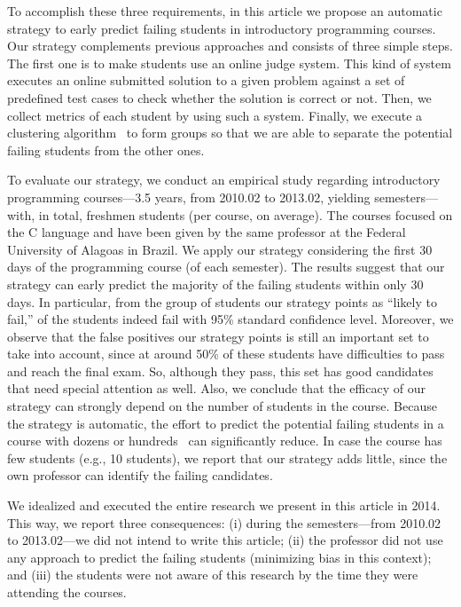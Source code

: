 To accomplish these three requirements, in this article we propose an automatic strategy to early predict failing students in introductory programming courses. Our strategy complements previous approaches and consists of three simple steps. The first one is to make students use an online judge system. This kind of system executes an online submitted solution to a given problem against a set of predefined test cases to check whether the solution is correct or not. Then, we collect metrics of each student by using such a system. Finally, we execute a clustering algorithm~\cite{hartigan-clustering-algorithms-1975} to form groups so that we are able to separate the potential failing students from the other ones.

To evaluate our strategy, we conduct an empirical study regarding \semesters introductory programming courses---3.5 years, from 2010.02 to 2013.02, yielding \semesters semesters---with, in total, \totalStudents freshmen students (\studentsCoursesAverage per course, on average). The courses focused on the C language and have been given by the same professor at the Federal University of Alagoas in Brazil. We apply our strategy considering the first 30 days of the programming course (\semesterPercentage of each semester). The results suggest that our strategy can early predict the majority of the failing students within only 30 days. In particular, from the group of students our strategy points as ``likely to fail,'' \higherPrecision of the students indeed fail with 95\% standard confidence level. Moreover, we observe that the false positives our strategy points is still an important set to take into account, since at around 50\% of these students have difficulties to pass and reach the final exam. So, although they pass, this set has good candidates that need special attention as well. Also, we conclude that the efficacy of our strategy can strongly depend on the number of students in the course. Because the strategy is automatic, the effort to predict the potential failing students in a course with dozens or hundreds~\cite{bennedsen-sigcse-failure-rates-2007} can significantly reduce. In case the course has few students (e.g., 10 students), we report that our strategy adds little, since the own professor can identify the failing candidates.

We idealized and executed the entire research we present in this article in 2014. This way, we report three consequences: (i) during the \semesters semesters---from 2010.02 to 2013.02---we did not intend to write this article; (ii) the professor did not use any approach to predict the failing students (minimizing bias in this context); and (iii) the students were not aware of this research by the time they were attending the courses.

